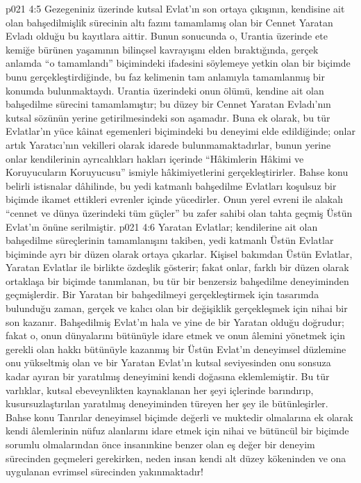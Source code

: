 \vs p021 4:5 Gezegeniniz üzerinde kutsal Evlat’ın son ortaya çıkışının, kendisine ait olan bahşedilmişlik sürecinin altı fazını tamamlamış olan bir Cennet Yaratan Evladı olduğu bu kayıtlara aittir. Bunun sonucunda o, Urantia üzerinde ete kemiğe bürünen yaşamının bilinçsel kavrayışını elden bıraktığında, gerçek anlamda “o tamamlandı” biçimindeki ifadesini söylemeye yetkin olan bir biçimde bunu gerçekleştirdiğinde, bu faz kelimenin tam anlamıyla tamamlanmış bir konumda bulunmaktaydı. Urantia üzerindeki onun ölümü, kendine ait olan bahşedilme sürecini tamamlamıştır; bu düzey bir Cennet Yaratan Evladı’nın kutsal sözünün yerine getirilmesindeki son aşamadır. Buna ek olarak, bu tür Evlatlar’ın yüce kâinat egemenleri biçimindeki bu deneyimi elde edildiğinde; onlar artık Yaratıcı’nın vekilleri olarak idarede bulunmamaktadırlar, bunun yerine onlar kendilerinin ayrıcalıkları hakları içerinde “Hâkimlerin Hâkimi ve Koruyucuların Koruyucusu” ismiyle hâkimiyetlerini gerçekleştirirler. Bahse konu belirli istisnalar dâhilinde, bu yedi katmanlı bahşedilme Evlatları koşulsuz bir biçimde ikamet ettikleri evrenler içinde yücedirler. Onun yerel evreni ile alakalı “cennet ve dünya üzerindeki tüm güçler” bu zafer sahibi olan tahta geçmiş Üstün Evlat’ın önüne serilmiştir.
\vs p021 4:6 Yaratan Evlatlar; kendilerine ait olan bahşedilme süreçlerinin tamamlanışını takiben, yedi katmanlı Üstün Evlatlar biçiminde ayrı bir düzen olarak ortaya çıkarlar. Kişisel bakımdan Üstün Evlatlar, Yaratan Evlatlar ile birlikte özdeşlik gösterir; fakat onlar, farklı bir düzen olarak ortaklaşa bir biçimde tanımlanan, bu tür bir benzersiz bahşedilme deneyiminden geçmişlerdir. Bir Yaratan bir bahşedilmeyi gerçekleştirmek için tasarımda bulunduğu zaman, gerçek ve kalıcı olan bir değişiklik gerçekleşmek için nihai bir son kazanır. Bahşedilmiş Evlat’ın hala ve yine de bir Yaratan olduğu doğrudur; fakat o, onun dünyalarını bütünüyle idare etmek ve onun âlemini yönetmek için gerekli olan hakkı bütünüyle kazanmış bir Üstün Evlat’ın deneyimsel düzlemine onu yükseltmiş olan ve bir Yaratan Evlat’ın kutsal seviyesinden onu sonsuza kadar ayıran bir yaratılmış deneyimini kendi doğasına eklemlemiştir. Bu tür varlıklar, kutsal ebeveynlikten kaynaklanan her şeyi içlerinde barındırıp, kusursuzlaştırılan yaratılmış deneyiminden türeyen her şey ile bütünleşirler. Bahse konu Tanrılar deneyimsel biçimde değerli ve muktedir olmalarına ek olarak kendi âlemlerinin nüfuz alanlarını idare etmek için nihai ve bütüncül bir biçimde sorumlu olmalarından önce insanınkine benzer olan eş değer bir deneyim sürecinden geçmeleri gerekirken, neden insan kendi alt düzey kökeninden ve ona uygulanan evrimsel sürecinden yakınmaktadır!
